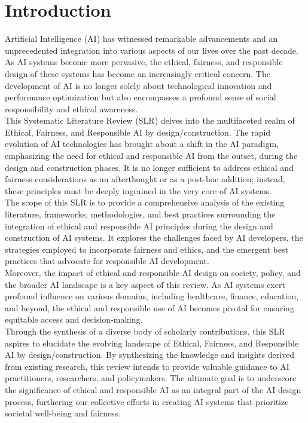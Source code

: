 \documentclass{article}
\begin{document}
\section{Introduction}
Artificial Intelligence (AI) has witnessed remarkable advancements and an unprecedented integration into various aspects of our lives over the past decade. As AI systems become more pervasive, the ethical, fairness, and responsible design of these systems has become an increasingly critical concern. The development of AI is no longer solely about technological innovation and performance optimization but also encompasses a profound sense of social responsibility and ethical awareness. \\
This Systematic Literature Review (SLR) delves into the multifaceted realm of Ethical, Fairness, and Responsible AI by design/construction. The rapid evolution of AI technologies has brought about a shift in the AI paradigm, emphasizing the need for ethical and responsible AI from the outset, during the design and construction phases. It is no longer sufficient to address ethical and fairness considerations as an afterthought or as a post-hoc addition; instead, these principles must be deeply ingrained in the very core of AI systems. \\
The scope of this SLR is to provide a comprehensive analysis of the existing literature, frameworks, methodologies, and best practices surrounding the integration of ethical and responsible AI principles during the design and construction of AI systems. It explores the challenges faced by AI developers, the strategies employed to incorporate fairness and ethics, and the emergent best practices that advocate for responsible AI development. \\
Moreover, the impact of ethical and responsible AI design on society, policy, and the broader AI landscape is a key aspect of this review. As AI systems exert profound influence on various domains, including healthcare, finance, education, and beyond, the ethical and responsible use of AI becomes pivotal for ensuring equitable access and decision-making. \\
Through the synthesis of a diverse body of scholarly contributions, this SLR aspires to elucidate the evolving landscape of Ethical, Fairness, and Responsible AI by design/construction. By synthesizing the knowledge and insights derived from existing research, this review intends to provide valuable guidance to AI practitioners, researchers, and policymakers. The ultimate goal is to underscore the significance of ethical and responsible AI as an integral part of the AI design process, furthering our collective efforts in creating AI systems that prioritize societal well-being and fairness.
\newpage
\end{document}
